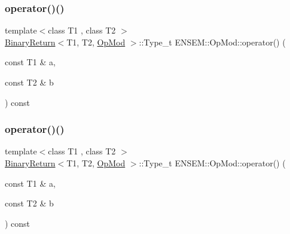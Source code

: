 \subsubsection{\texorpdfstring{operator()()}{operator()()}\hspace{0.1cm}{\footnotesize\ttfamily [1/3]}}
{\footnotesize\ttfamily template$<$class T1 , class T2 $>$ \\
\mbox{\hyperlink{structENSEM_1_1BinaryReturn}{Binary\+Return}}$<$T1, T2, \mbox{\hyperlink{structENSEM_1_1OpMod}{Op\+Mod}} $>$\+::Type\+\_\+t E\+N\+S\+E\+M\+::\+Op\+Mod\+::operator() (\begin{DoxyParamCaption}\item[{const T1 \&}]{a,  }\item[{const T2 \&}]{b }\end{DoxyParamCaption}) const\hspace{0.3cm}{\ttfamily [inline]}}

\mbox{\label{structENSEM_1_1OpMod_ab377d613c8fa223caa60de3292a55685}} 
\subsubsection{\texorpdfstring{operator()()}{operator()()}\hspace{0.1cm}{\footnotesize\ttfamily [2/3]}}
{\footnotesize\ttfamily template$<$class T1 , class T2 $>$ \\
\mbox{\hyperlink{structENSEM_1_1BinaryReturn}{Binary\+Return}}$<$T1, T2, \mbox{\hyperlink{structENSEM_1_1OpMod}{Op\+Mod}} $>$\+::Type\+\_\+t E\+N\+S\+E\+M\+::\+Op\+Mod\+::operator() (\begin{DoxyParamCaption}\item[{const T1 \&}]{a,  }\item[{const T2 \&}]{b }\end{DoxyParamCaption}) const\hspace{0.3cm}{\ttfamily [inline]}}

\mbox{\label{structENSEM_1_1OpMod_ab377d613c8fa223caa60de3292a55685}} 
